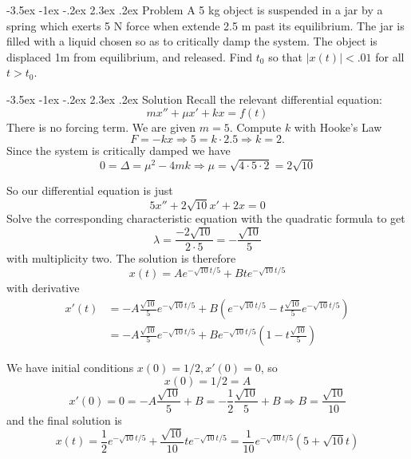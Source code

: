 \documentclass[11pt]{article}
\makeatletter
\renewcommand\section{\@startsection{section}{1}{\z@}%
                                  {-3.5ex \@plus -1ex \@minus -.2ex}%
                                  {2.3ex \@plus.2ex}%
                                  {\normalfont\large\bfseries}}
\makeatother
\begin{document}
\section{Problem}
A 5 kg object is suspended in a jar by a spring which exerts 5 N force when extende 2.5 m past its equilibrium. The jar is filled with a liquid chosen so as to critically damp the system. The object is displaced 1m from equilibrium, and released. Find $t_0$ so that $|x(t)| < .01 $ for all $t > t_0$.

\section{Solution}
Recall the relevant differential equation:
\[m x'' + \mu x' + kx  = f(t)\]
There is no forcing term. We are given $m= 5$. Compute $k$ with Hooke's Law
\[ F = -k x \Rightarrow 5 = k \cdot 2.5 \Rightarrow k = 2.\]
Since the system is critically damped we have
\[0 = \Delta = \mu^2 - 4 m k   \Rightarrow \mu = \sqrt{4 \cdot 5 \cdot 2} = 2 \sqrt{10}  \]

So our differential equation is just
\[5 x'' + 2 \sqrt{10} x' + 2 x =0\]
Solve the corresponding characteristic equation with the quadratic formula to get
\[ \lambda = \frac{- 2 \sqrt{10}}{2 \cdot 5} = - \frac{\sqrt{10}}{5}\]
with multiplicity two. The solution is therefore
\[x(t) = A e^{- \sqrt{10} t/ 5} + B t e^{- \sqrt{10} t/ 5}\]
with derivative
\begin{align*}x'(t) &= -A \frac{\sqrt{10}}{5} e^{- \sqrt{10} t/ 5} + B\left(e^{- \sqrt{10} t/ 5}   -t \frac{\sqrt{10}}{5} e^{- \sqrt{10} t/ 5}\right) \\ &= -A \frac{\sqrt{10}}{5} e^{- \sqrt{10} t/ 5} + Be^{- \sqrt{10} t/ 5} \left(1  -t \frac{\sqrt{10}}{5} \right) \end{align*}

We have initial conditions $x(0) = 1/2, x'(0) = 0$, so
\[x(0) = 1/2  = A\]
\[x'(0) = 0 = -A \frac{\sqrt{10}}{5}  + B  =  - \frac{1}{2} \frac{\sqrt{10}}{5} + B \Rightarrow B  = \frac{\sqrt{10}}{10} \]
and the final solution is
\[x(t) = \frac{1}{2} e^{- \sqrt{10} t/ 5} + \frac{\sqrt{10}}{10} t e^{- \sqrt{10} t/ 5} = \frac{1}{10}e^{- \sqrt{10} t/ 5} \left (5  + \sqrt{10} t \right) \]
\end{document}
